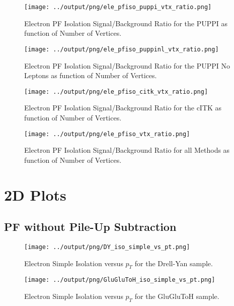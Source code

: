 \documentclass[11pt]{book}
\begin{document}
\begin{figure}[htb]
\centering
\texttt{[image: ../output/png/ele\_pfiso\_puppi\_vtx\_ratio.png]}
\caption{Electron PF Isolation Signal/Background Ratio for the PUPPI as function of Number of Vertices.}
\label{fig:ele_pfiso_vtx_ratio_puppi}
\end{figure}

\begin{figure}[htb]
\centering
\texttt{[image: ../output/png/ele\_pfiso\_puppinl\_vtx\_ratio.png]}
\caption{Electron PF Isolation Signal/Background Ratio for the PUPPI No Leptons as function of Number of Vertices.}
\label{fig:ele_pfiso_vtx_ratio_puppinl}
\end{figure}

\begin{figure}[htb]
\centering
\texttt{[image: ../output/png/ele\_pfiso\_citk\_vtx\_ratio.png]}
\caption{Electron PF Isolation Signal/Background Ratio for the cITK as function of Number of Vertices.}
\label{fig:ele_pfiso_vtx_ratio_citk}
\end{figure}

\begin{figure}[htb]
\centering
\texttt{[image: ../output/png/ele\_pfiso\_vtx\_ratio.png]}
\caption{Electron PF Isolation Signal/Background Ratio for all Methods as function of Number of Vertices.}
\label{fig:ele_pfiso_vtx_ratio}
\end{figure}
\clearpage

\chapter{2D Plots}
\section{PF without Pile-Up Subtraction}

\begin{figure}[htb]
\centering
\texttt{[image: ../output/png/DY\_iso\_simple\_vs\_pt.png]}
\caption{Electron Simple Isolation versus $p_{T}$ for the Drell-Yan sample.}
\label{fig:dy_iso_simple_vs_pt}
\end{figure}

\begin{figure}[htb]
\centering
\texttt{[image: ../output/png/GluGluToH\_iso\_simple\_vs\_pt.png]}
\caption{Electron Simple Isolation versus $p_{T}$ for the GluGluToH sample.}
\label{fig:ggh_iso_simple_vs_pt}
\end{figure}
\end{document}

